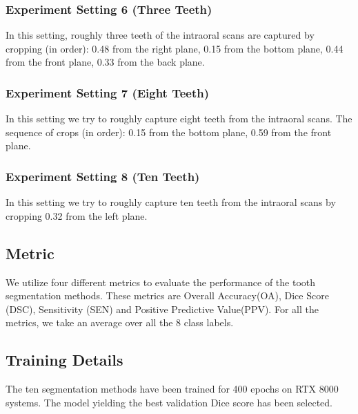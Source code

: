 \documentclass[letterpaper, 10 pt, conference]{ieeeconf}  %
\begin{document}
\subsubsection{Experiment Setting 6 (Three Teeth)} In this setting, roughly three teeth of the intraoral scans are captured by cropping (in order): 0.48 from the right plane, 0.15 from the bottom plane, 0.44 from the front plane, 0.33 from the back plane.
\subsubsection{Experiment Setting 7 (Eight Teeth)} In this setting we try to roughly capture eight teeth from the intraoral scans. The sequence of crops (in order): 0.15 from the bottom plane, 0.59 from the front plane.
\subsubsection{Experiment Setting 8 (Ten Teeth)} In this setting we try to roughly capture ten teeth from the intraoral scans by cropping 0.32 from the left plane.

\subsection{Metric} We utilize four different metrics to evaluate the performance of the tooth segmentation methods. These metrics are Overall Accuracy(OA), Dice Score (DSC), Sensitivity (SEN) and Positive Predictive Value(PPV). For all the metrics, we take an average over all the 8  class labels.

\subsection{Training Details} The ten segmentation methods have been trained for 400 epochs on RTX 8000 systems. The model yielding the best validation Dice score has been selected.
\end{document}
